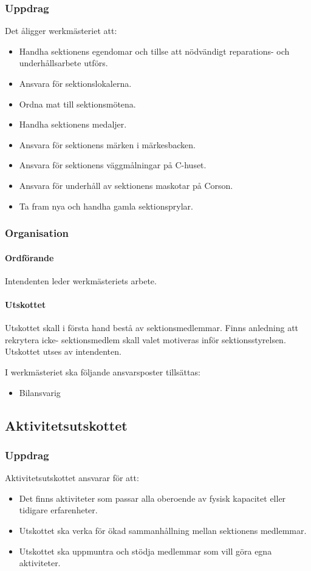\documentclass{datateknologsektionen-document}
\begin{document}
\subsubsection{Uppdrag}
Det åligger werkmästeriet att:
\begin{itemize}
  \item Handha sektionens egendomar och tillse att nödvändigt reparations- och underhållsarbete utförs.
  \item Ansvara för sektionslokalerna.
  \item Ordna mat till sektionsmötena.
  \item Handha sektionens medaljer.
  \item Ansvara för sektionens märken i märkesbacken.
  \item Ansvara för sektionens väggmålningar på C-huset.
  \item Ansvara för underhåll av sektionens maskotar på Corson.
  \item Ta fram nya och handha gamla sektionsprylar.
\end{itemize}

\subsubsection{Organisation}
\paragraph{Ordförande}
Intendenten leder werkmästeriets arbete.

\paragraph{Utskottet}

Utskottet skall i första hand bestå av sektionsmedlemmar. Finns anledning att rekrytera icke-
sektionsmedlem skall valet motiveras inför sektionsstyrelsen. Utskottet utses av intendenten.

I werkmästeriet ska följande ansvarsposter tillsättas:
\begin{itemize}
  \item Bilansvarig
\end{itemize}

\subsection{Aktivitetsutskottet}
\label{aktu}
\subsubsection{Uppdrag}
Aktivitetsutskottet ansvarar för att:
\begin{itemize}
  \item Det finns aktiviteter som passar alla oberoende av fysisk kapacitet eller tidigare erfarenheter.
  \item Utskottet ska verka för ökad sammanhållning mellan sektionens medlemmar.
  \item Utskottet ska uppmuntra och stödja medlemmar som vill göra egna aktiviteter.
\end{itemize}
\end{document}
